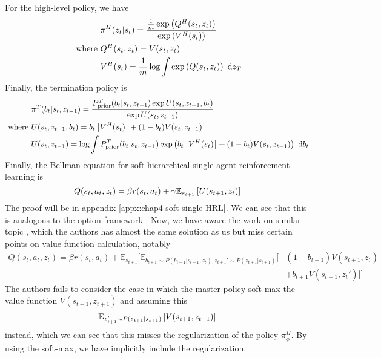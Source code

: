 For the high-level policy, we have 
\begin{equation}
\begin{aligned}
    &\pi^H(z_t | s_t) = \frac{\frac{1}{m}\exp\left( Q^H(s_t, z_t) \right)}{\exp\left( V^H(s_t) \right)}
    \\
    \text{ where } &Q^H(s_t, z_t) =  V(s_t, z_t)  \\
    &V^H(s_t) =  \frac{1}{m}\log \int \exp\left( Q(s_t, z_t) \right) \ \mathrm{d} z_T
\end{aligned} 
\end{equation}
Finally, the termination policy is 
\begin{equation}
\begin{aligned}
    &\pi^T(b_{t} | s_{t}, z_{t-1}) = \frac{P_{\text{prior}}^T(b_{t} | s_{t}, z_{t-1})\exp{U(s_{t}, z_{t-1}, b_{t})}}{\exp U(s_{t}, z_{t-1})} \\
    \text{ where }& U(s_{t}, z_{t-1}, b_{t}) = b_{t} \left[ V^H(s_{t}) \right] + (1-b_{t})V(s_{t}, z_{t-1}) \\
    & U(s_{t}, z_{t-1}) = \log \int P_{\text{prior}}^T(b_{t} | s_{t}, z_{t-1})\exp\left( b_{t} \left[ V^H(s_{t}) \right] + (1-b_{t})V(s_{t}, z_{t-1}) \right) \ \mathrm{d} b_{t}
\end{aligned}
\end{equation}
Finally, the Bellman equation for soft-hierarchical single-agent reinforcement learning is 
\begin{equation}
    Q(s_t, a_t, z_t) = \beta r(s_t, a_t) + \gamma\mathbb{E}_{s_{t+1}}\left[ U(s_{t+1}, z_t) \right]
\end{equation}
The proof will be in appendix \ref{appx:chap4-soft-single-HRL}. We can see that this is analogous to the option framework \cite{sutton1999between, bacon2017option}. Now, we have aware the work on similar topic \cite{lobo2019soft}, which the authors has almost the same solution as us but miss certain points on value function calculation, notably 
\begin{equation}
\begin{aligned}
Q(s_t, a_t, z_t) = \beta r(s_t, a_t) + \mathbb{E}_{s_{t+1}}\Big[\mathbb{E}_{b_{t+1} \sim P(b_{t+1} | s_{t+1}, z_t), z_{t+1}' \sim P(z_{t+1} | s_{t+1})}\Big[&(1-b_{t+1})V(s_{t+1 }, z_t)  \\
&+ b_{t+1}V(s_{t+1 }, z_t')\Big]\Big]
\end{aligned}
\end{equation}
The authors fails to consider the case in which the master policy soft-max the value function $V(s_{t+1}, z_{t+1})$ and assuming this 
\begin{equation}
    \mathbb{E}_{z_{t+1}' \sim P(z_{t+1} | s_{t+1})}\left[ V(s_{t+1}, z_{t+1}) \right]
\end{equation}
instead, which we can see that this misses the regularization of the policy $\pi^H_\phi$. By using the soft-max, we have implicitly include the regularization. 